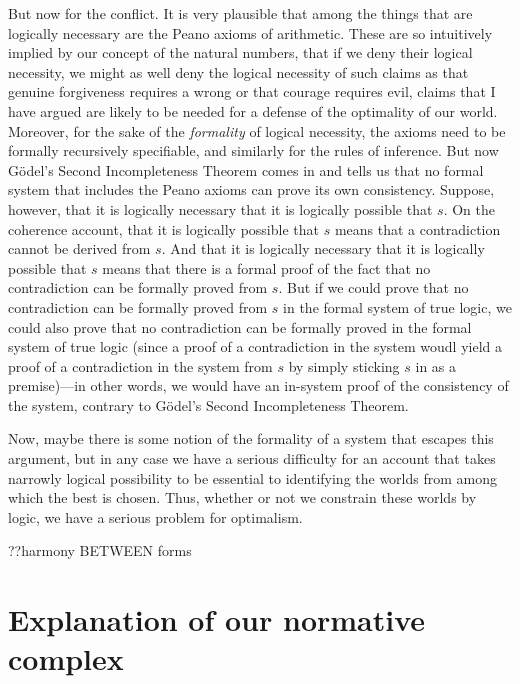 But now for the conflict. It is very plausible that among the things that are logically necessary are the Peano axioms of 
arithmetic. These are so intuitively implied by our concept of the natural numbers, that if we deny their logical necessity,
we might as well deny the logical necessity of such claims as that genuine forgiveness requires a wrong or that courage 
requires evil, claims that I have argued are likely to be needed for a defense of the optimality of our world. Moreover, for
the sake of the \textit{formality} of logical necessity, the axioms need to be formally recursively specifiable, and similarly
for the rules of inference. But now G\"odel's Second Incompleteness Theorem comes in and tells us that no formal system 
that includes the Peano axioms can prove its own consistency. Suppose, however, that it is logically necessary that it is 
logically possible that $s$. On the coherence account, that it is logically possible that $s$ means that a contradiction
cannot be derived from $s$. And that it is logically necessary that it is logically possible that $s$ means that there is 
a formal proof of the fact that no contradiction can be formally proved from $s$. But if we could prove that no 
contradiction can be formally proved from $s$ in the formal system of true logic, we could also prove that no 
contradiction can be formally proved in the formal system of true logic (since a proof of a contradiction in the system
woudl yield a proof of a contradiction in the system from $s$ by simply sticking $s$ in as a premise)---in other words,
we would have an in-system proof of the consistency of the system, contrary to G\"odel's Second Incompleteness Theorem.

Now, maybe there is some notion of the formality of a system that escapes this argument, but in any case we have a 
serious difficulty for an account that takes narrowly logical possibility to be essential to identifying the worlds 
from among which the best is chosen. Thus, whether or not we constrain these worlds by logic, we have a serious problem
for optimalism.

??harmony BETWEEN forms

\section{Explanation of our normative complex}






